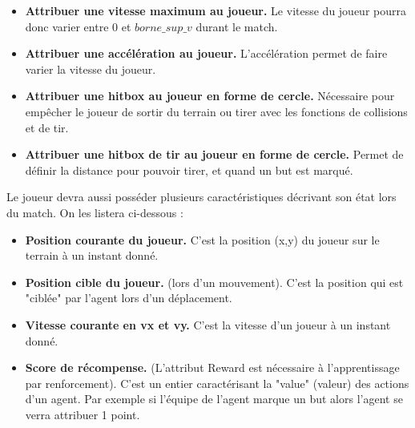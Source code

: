 \documentclass[11pt, a4paper]{article}
\begin{document}
\begin{enumerate}
{\begin{itemize}
			\item \textbf{Attribuer une vitesse maximum au joueur.} 
			Le vitesse du joueur pourra donc varier entre 0 et $borne\_sup\_v$ durant le match.

      		\item \textbf{Attribuer une accélération au joueur.} 
			L'accélération permet de faire varier la vitesse du joueur.

			\item \textbf{Attribuer une hitbox au joueur en forme de cercle.} 
			Nécessaire pour empêcher le joueur de sortir du terrain ou tirer avec les fonctions de collisions et de tir.
			
			\item \textbf{Attribuer une hitbox de tir au joueur en forme de cercle.} 
			Permet de définir la distance pour pouvoir tirer, et quand un but est marqué.
		\\	
		\end{itemize}
		Le joueur devra aussi posséder plusieurs caractéristiques décrivant son état lors du match. On les listera ci-dessous :
		\begin{itemize}
			\item \textbf{Position courante du joueur.} 
			C'est la position (x,y) du joueur sur le terrain à un instant donné.
			
			\item \textbf{Position cible du joueur.} (lors d'un mouvement). 
			C'est la position qui est "ciblée" par l'agent lors d'un déplacement.
			
			\item \textbf{Vitesse courante en vx et vy.}
			C'est la vitesse d'un joueur à un instant donné.

			\item \textbf{Score de récompense.} (L'attribut Reward est nécessaire à l'apprentissage par renforcement).
			C'est un entier caractérisant la "value" (valeur) des actions d'un agent. Par exemple si l'équipe de l'agent marque un but alors l'agent se verra attribuer 1 point.
			

\end{itemize}}
\end{enumerate}
\end{document}
